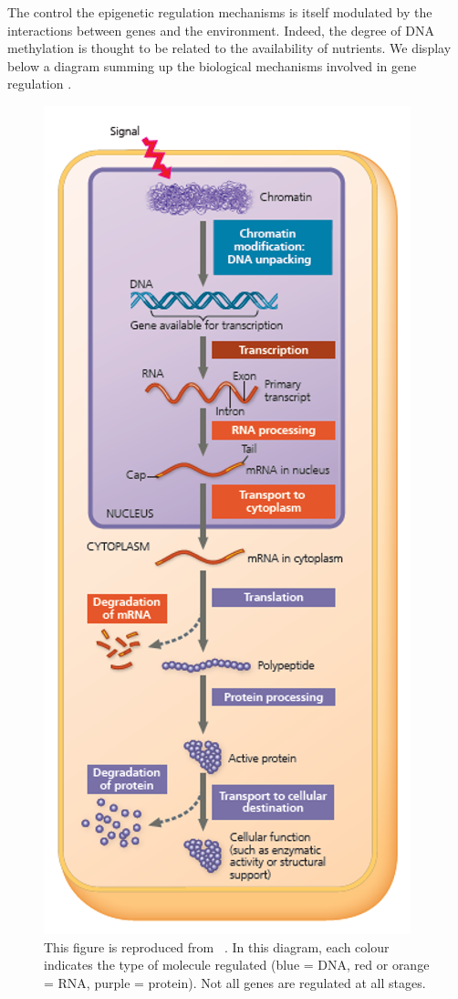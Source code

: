 The control the epigenetic regulation mechanisms is itself modulated by the interactions between genes and the environment. Indeed, the degree of DNA methylation is thought to be related to the availability of nutrients. We display below a diagram summing up the biological mechanisms involved in gene regulation .

\begin{figure}
    \centering
    \includegraphics{figures/global-gene-regulation.png}
    \caption[The main gene regulation stages.]{This figure is reproduced from ~\autocite[Fig.~18.6, p.~370]{campbell_etal20}. In this diagram, each colour indicates the type of molecule regulated (blue = DNA, red or orange = RNA, purple = protein). Not all genes are regulated at all stages.}
    \label{fig:gene-regulation}
\end{figure}

